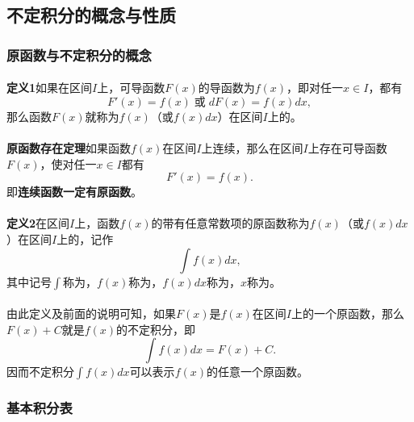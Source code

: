 \subsection{不定积分的概念与性质}
\subsubsection{原函数与不定积分的概念}
\paragraph{}
\textbf{定义1\;}如果在区间$I$上，可导函数$F(x)$的导函数为$f(x)$，即对任一$x\in I$，都有
\begin{equation}
  F'(x) = f(x) \;\textbf{或}\; dF(x) = f(x)dx,
\end{equation}
那么函数$F(x)$就称为$f(x)$（或$f(x)dx$）在区间$I$上的。

\paragraph{}
\textbf{原函数存在定理\;}如果函数$f(x)$在区间$I$上连续，那么在区间$I$上存在可导函数$F(x)$，使对任一$x\in I$都有
\begin{equation*}
  F'(x) = f(x).
\end{equation*}
即\textbf{连续函数一定有原函数}。

\paragraph{}
\textbf{定义2\;}在区间$I$上，函数$f(x)$的带有任意常数项的原函数称为$f(x)$（或$f(x)dx$）在区间$I$上的，记作
\begin{equation}
  \int{f(x)dx},
\end{equation}
其中记号$\int$称为，$f(x)$称为，$f(x)dx$称为，$x$称为。

\paragraph{}
由此定义及前面的说明可知，如果$F(x)$是$f(x)$在区间$I$上的一个原函数，那么$F(x)+C$就是$f(x)$的不定积分，即
\begin{equation}
  \int{f(x)dx} = F(x) + C.
\end{equation}
因而不定积分$\int{f(x)dx}$可以表示$f(x)$的任意一个原函数。

\subsubsection{基本积分表}
